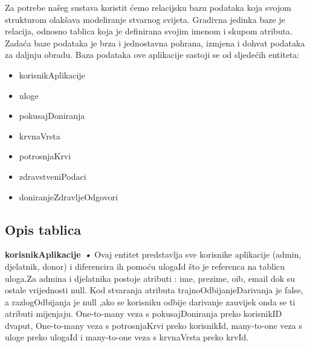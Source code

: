 		Za potrebe našeg sustava koristit ćemo relacijsku bazu podataka koja svojom strukturom olakšava modeliranje stvarnog svijeta. Gradivna jedinka baze je relacija, odnosno tablica koja je definirana svojim imenom i skupom atributa. Zadaća baze podataka je brza i jednostavna pohrana, izmjena i dohvat podataka za daljnju obradu.
Baza podataka ove aplikacije sastoji se od sljedećih entiteta: 
\begin{itemize}
		\item korisnikAplikacije
		\item uloge
		\item pokusajDoniranja
		\item krvnaVrsta
		\item potrosnjaKrvi
		\item zdravstveniPodaci
		\item doniranjeZdravljeOdgovori
		
	\end{itemize}

		\eject
			\subsection{Opis tablica}
			

				\textbf{korisnikAplikacije \textit{•}}
				 Ovaj entitet predstavlja sve korisnike aplikacije (admin, djelatnik, donor) i diferencira ih pomoću ulogaId što je referenca na tablicu uloga.Za admina i djelatnika postoje atributi : ime, prezime, oib, email dok su ostale vrijednosti null. Kod stvaranja atributa trajnoOdbijanjeDarivanja je false, a razlogOdbijanja je null ,ako se korisniku odbije darivanje zauvijek onda se ti atributi mijenjaju. One-to-many veza s pokusajDoniranja preko korisnikID dvaput, One-to-many veza s potrosnjaKrvi preko korisnikId, many-to-one veza s uloge preko ulogaId i many-to-one veza s krvnaVrsta preko krvId.

